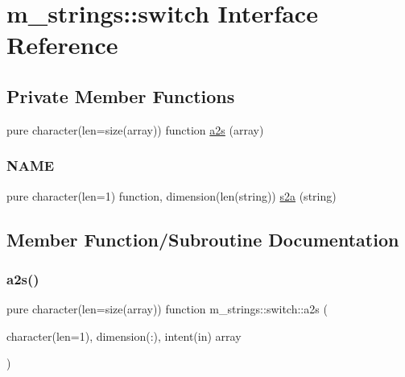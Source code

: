\hypertarget{interfacem__strings_1_1switch}{}\section{m\+\_\+strings\+:\+:switch Interface Reference}
\label{interfacem__strings_1_1switch}
\subsection*{Private Member Functions}
\begin{DoxyCompactItemize}
\item 
pure character(len=size(array)) function \mbox{\hyperlink{interfacem__strings_1_1switch_a9e8d2a8effdbed2a822cfe14bbb9983c}{a2s}} (array)
\begin{DoxyCompactList}\small\item\em \subsubsection*{N\+A\+ME}\end{DoxyCompactList}\item 
pure character(len=1) function, dimension(len(string)) \mbox{\hyperlink{interfacem__strings_1_1switch_a60d3e2ead0b3cfd08eaf61f93d3caf57}{s2a}} (string)
\end{DoxyCompactItemize}


\subsection{Member Function/\+Subroutine Documentation}
\mbox{\label{interfacem__strings_1_1switch_a9e8d2a8effdbed2a822cfe14bbb9983c}} 
\subsubsection{\texorpdfstring{a2s()}{a2s()}}
{\footnotesize\ttfamily pure character(len=size(array)) function m\+\_\+strings\+::switch\+::a2s (\begin{DoxyParamCaption}\item[{character(len=1), dimension(\+:), intent(in)}]{array }\end{DoxyParamCaption})\hspace{0.3cm}{\ttfamily [private]}}



